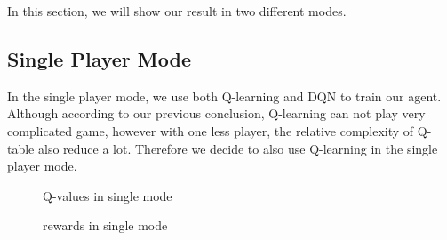 \documentclass[12pt]{article}
\begin{document}
In this section, we will show our result in two different modes.

\subsection{Single Player Mode}

In the single player mode, we use both Q-learning and DQN to train our agent. Although according to our previous conclusion, Q-learning can not play very complicated game, however with one less player, the relative complexity of Q-table also reduce a lot. Therefore we decide to also use Q-learning in the single player mode.

\begin{figure}[htbp]
	\centering
	\caption{Q-values in single mode}
\end{figure}
\begin{figure}[htbp]
	\centering
	\caption{rewards in single mode}
\end{figure}
\end{document}
